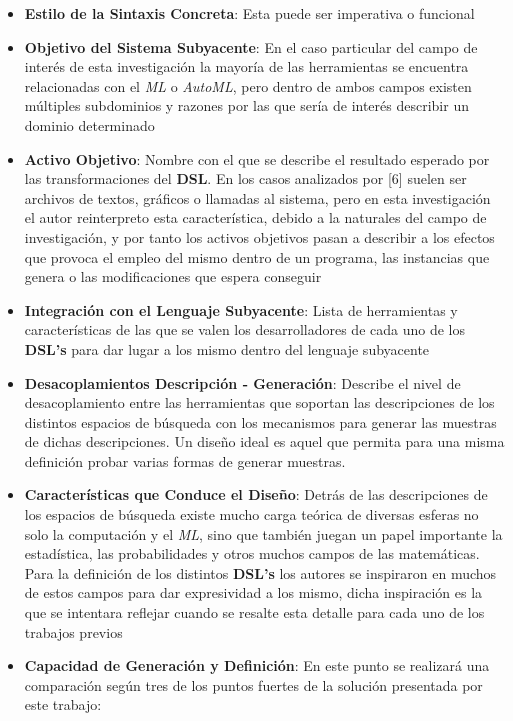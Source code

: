 \begin{itemize}
      \item {\bf Estilo de la Sintaxis Concreta}: Esta puede ser imperativa o funcional
      \item {\bf Objetivo del Sistema Subyacente}: En el caso particular del campo de interés de esta
            investigación la mayoría de las herramientas se encuentra relacionadas con el {\it ML} o
                  {\it AutoML}, pero dentro de ambos campos existen múltiples subdominios y razones por las que
            sería de interés describir un dominio determinado
      \item {\bf Activo Objetivo}: Nombre con el que se describe el resultado esperado por las transformaciones
            del {\bf DSL}. En los casos analizados por [6] suelen ser archivos de textos, gráficos o llamadas
            al sistema, pero en esta investigación el autor reinterpreto esta característica, debido a la
            naturales del campo de investigación, y por tanto los activos objetivos pasan a describir a
            los efectos que provoca el empleo del mismo dentro de un programa, las instancias que
            genera o las modificaciones que espera conseguir
      \item {\bf Integración con el Lenguaje Subyacente}: Lista de herramientas y características de las
            que se valen los desarrolladores de cada uno de los {\bf DSL's} para dar lugar a los mismo dentro
            del lenguaje subyacente
      \item {\bf Desacoplamientos Descripción - Generación}: Describe el nivel de desacoplamiento entre
            las herramientas que soportan las descripciones de los distintos espacios de búsqueda con
            los mecanismos para generar las muestras de dichas descripciones. Un diseño ideal
            es aquel que permita para una misma definición probar varias formas de generar muestras.
      \item {\bf Características que Conduce el Diseño}: Detrás de las descripciones de los espacios de
            búsqueda existe mucho carga teórica de diversas esferas no solo la computación y el {\it ML},
            sino que también juegan un papel importante la estadística, las probabilidades y otros muchos
            campos de las matemáticas. Para la definición de los distintos {\bf DSL's} los autores se inspiraron
            en muchos de estos campos para dar expresividad a los mismo, dicha inspiración es la que se
            intentara reflejar cuando se resalte esta detalle para cada uno de los trabajos previos
      \item {\bf Capacidad de Generación y Definición}: En este punto se realizará una comparación según tres
            de los puntos fuertes de la solución presentada por este trabajo:
            \begin{itemize}


\end{itemize}
\end{itemize}
